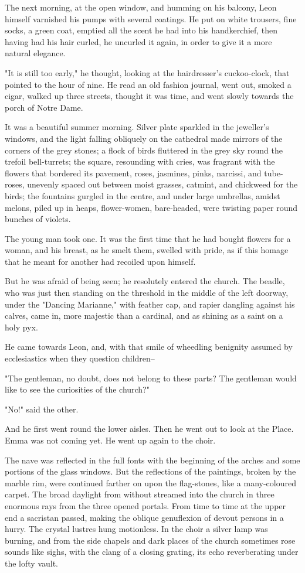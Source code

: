 \documentclass[11pt,twocolumn]{ltugboat}
\begin{document}
The next morning, at the open window, and humming on his balcony, Leon
himself varnished his pumps with several coatings. He put on white
trousers, fine socks, a green coat, emptied all the scent he had into
his handkerchief, then having had his hair curled, he uncurled it again,
in order to give it a more natural elegance.

"It is still too early," he thought, looking at the hairdresser's
cuckoo-clock, that pointed to the hour of nine. He read an old fashion
journal, went out, smoked a cigar, walked up three streets, thought it
was time, and went slowly towards the porch of Notre Dame.

It was a beautiful summer morning. Silver plate sparkled in the
jeweller's windows, and the light falling obliquely on the cathedral
made mirrors of the corners of the grey stones; a flock of birds
fluttered in the grey sky round the trefoil bell-turrets; the square,
resounding with cries, was fragrant with the flowers that bordered its
pavement, roses, jasmines, pinks, narcissi, and tube-roses, unevenly
spaced out between moist grasses, catmint, and chickweed for the birds;
the fountains gurgled in the centre, and under large umbrellas, amidst
melons, piled up in heaps, flower-women, bare-headed, were twisting
paper round bunches of violets.

The young man took one. It was the first time that he had bought flowers
for a woman, and his breast, as he smelt them, swelled with pride, as if
this homage that he meant for another had recoiled upon himself.

But he was afraid of being seen; he resolutely entered the church. The
beadle, who was just then standing on the threshold in the middle of the
left doorway, under the "Dancing Marianne," with feather cap, and rapier
dangling against his calves, came in, more majestic than a cardinal, and
as shining as a saint on a holy pyx.

He came towards Leon, and, with that smile of wheedling benignity
assumed by ecclesiastics when they question children--

"The gentleman, no doubt, does not belong to these parts? The gentleman
would like to see the curiosities of the church?"

"No!" said the other.

And he first went round the lower aisles. Then he went out to look at
the Place. Emma was not coming yet. He went up again to the choir.

The nave was reflected in the full fonts with the beginning of the
arches and some portions of the glass windows. But the reflections of
the paintings, broken by the marble rim, were continued farther on upon
the flag-stones, like a many-coloured carpet. The broad daylight from
without streamed into the church in three enormous rays from the three
opened portals. From time to time at the upper end a sacristan passed,
making the oblique genuflexion of devout persons in a hurry. The crystal
lustres hung motionless. In the choir a silver lamp was burning, and
from the side chapels and dark places of the church sometimes rose
sounds like sighs, with the clang of a closing grating, its echo
reverberating under the lofty vault.
\end{document}
